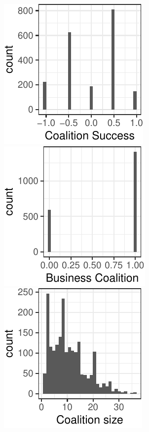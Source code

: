 \documentclass[
      12pt,
        ]{article}
\begin{document}
\includegraphics{Figs/hist_coalitions-1.pdf} \includegraphics{Figs/hist_coalitions-2.pdf} \includegraphics{Figs/hist_coalitions-3.pdf}
\end{document}
